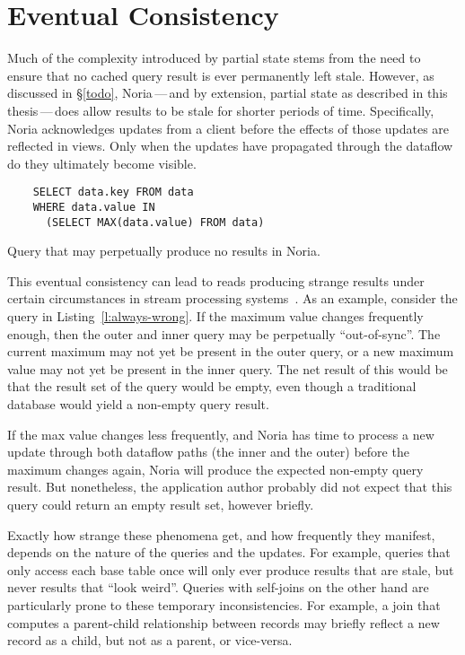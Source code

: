 \section{Eventual Consistency}

Much of the complexity introduced by partial state stems from the need to ensure
that no cached query result is ever permanently left stale. However, as
discussed in \S\ref{todo}, Noria\,---\,and by extension, partial state as
described in this thesis\,---\,does allow results to be stale for shorter
periods of time. Specifically, Noria acknowledges updates from a client before
the effects of those updates are reflected in views. Only when the updates have
propagated through the dataflow do they ultimately become visible.

\begin{listing}[h]
  \begin{verbatim}
    SELECT data.key FROM data
    WHERE data.value IN
      (SELECT MAX(data.value) FROM data)
  \end{verbatim}
  \caption{Query that may perpetually produce no results in Noria.}
  \label{l:always-wrong}
\end{listing}

This eventual consistency can lead to reads producing strange results
under certain circumstances in stream processing
systems~\cite{materialize-eventual}. As an example, consider the query in
Listing~\ref{l:always-wrong}. If the maximum value changes frequently enough,
then the outer and inner query may be perpetually ``out-of-sync''. The current
maximum may not yet be present in the outer query, or a new maximum value may
not yet be present in the inner query. The net result of this would be that the
result set of the query would be empty, even though a traditional database would
yield a non-empty query result.

If the max value changes less frequently, and Noria has time to process a new
update through both dataflow paths (the inner and the outer) before the maximum
changes again, Noria will produce the expected non-empty query result. But
nonetheless, the application author probably did not expect that this query
could return an empty result set, however briefly.

Exactly how strange these phenomena get, and how frequently they manifest,
depends on the nature of the queries and the updates. For example, queries that
only access each base table once will only ever produce results that are stale,
but never results that ``look weird''. Queries with self-joins on the other hand
are particularly prone to these temporary inconsistencies. For example, a join
that computes a parent-child relationship between records may briefly reflect a
new record as a child, but not as a parent, or vice-versa.

